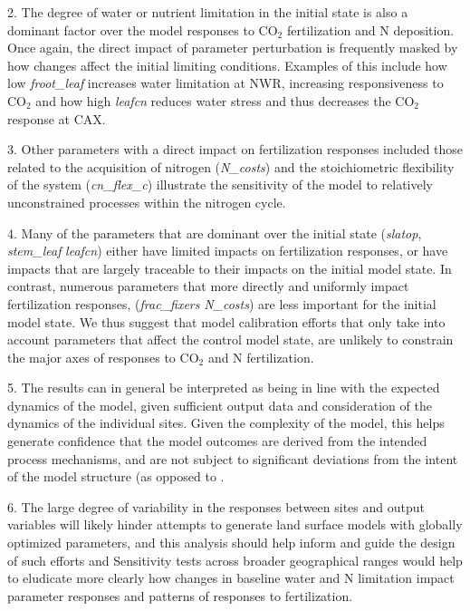 \documentclass[draft,linenumbers]{agujournal}
\begin{document}
2. The degree of water or nutrient limitation in the initial state is also a dominant factor over the model responses to CO$_{2}$ fertilization and N deposition. Once again, the direct impact of parameter perturbation is frequently masked by how changes affect the initial limiting conditions. Examples of this include how low \emph{froot\_leaf} increases water limitation at NWR, increasing responsiveness to CO$_{2}$ and how high \emph{leafcn} reduces water stress and thus decreases the CO$_{2}$ response at CAX. 

3. Other parameters with a direct impact on fertilization responses included those related to the acquisition of nitrogen (\emph{N\_costs}) and the stoichiometric flexibility of the system (\emph{cn\_flex\_c}) illustrate the sensitivity of the model to relatively unconstrained processes within the nitrogen cycle.   

4. Many of the parameters that are dominant over the initial state (\emph{slatop}, \emph{stem\_leaf} \emph{leafcn}) either have limited impacts on fertilization responses, or have impacts that are largely traceable to their impacts on the initial model state. In contrast, numerous parameters that more directly and uniformly impact fertilization responses, (\emph{frac\_fixers} \emph{N\_costs}) are less important for the initial model state. We thus suggest that model calibration efforts that only take into account parameters that affect the control model state, are unlikely to constrain the major axes of responses to CO$_{2}$ and N fertilization. 

5. The results can in general be interpreted as being in line with the expected dynamics of the model, given sufficient output data and consideration of the dynamics of the individual sites. Given the complexity of the model, this helps generate confidence that the model outcomes are derived from the intended process mechanisms, and are not subject to significant deviations from the intent of the model structure (as opposed to .  

6. The large degree of variability in the responses between sites and output variables will likely hinder attempts to generate land surface models with globally optimized parameters, and this analysis should help inform and guide the design of such efforts and  Sensitivity tests across broader geographical ranges would help to eludicate more clearly how changes in baseline water and N limitation impact parameter responses and patterns of responses to fertilization.
\end{document}
